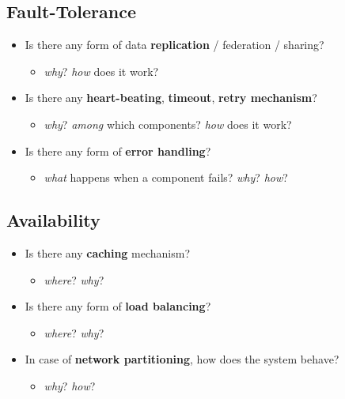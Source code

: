 \documentclass{scrartcl}
\begin{document}
\subsection{Fault-Tolerance}\label{fault-tolerance}

\begin{itemize}
	\item Is there any form of data \textbf{replication} / federation / sharing?
	\begin{itemize}
		\item \emph{why}? \emph{how} does it work?
	\end{itemize}
	
	\item Is there any \textbf{heart-beating}, \textbf{timeout}, \textbf{retry mechanism}?
	\begin{itemize}
		\item \emph{why}? \emph{among} which components? \emph{how} does it work?
	\end{itemize}
	
	\item Is there any form of \textbf{error handling}?
	\begin{itemize}
		\item \emph{what} happens when a component fails? \emph{why}? \emph{how}?
	\end{itemize}
\end{itemize}

\subsection{Availability}\label{availability}

\begin{itemize}
	\item Is there any \textbf{caching} mechanism?
	\begin{itemize}
		\item \emph{where}? \emph{why}?
	\end{itemize}
	
	\item Is there any form of \textbf{load balancing}?
	\begin{itemize}
		\item \emph{where}? \emph{why}?
	\end{itemize}
	
	\item In case of \textbf{network partitioning}, how does the system behave?
	\begin{itemize}
		\item \emph{why}? \emph{how}?
	\end{itemize}
\end{itemize}
\end{document}
